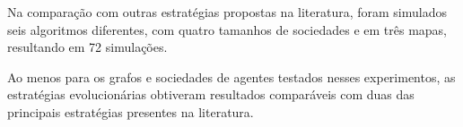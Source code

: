 Na comparação com outras estratégias propostas na literatura, foram simulados 
seis algoritmos diferentes, com quatro tamanhos de sociedades e em três mapas, 
resultando em 72 simulações.

Ao menos para os grafos e sociedades de agentes testados nesses experimentos, 
as estratégias evolucionárias obtiveram resultados comparáveis com duas das 
principais estratégias presentes na literatura.